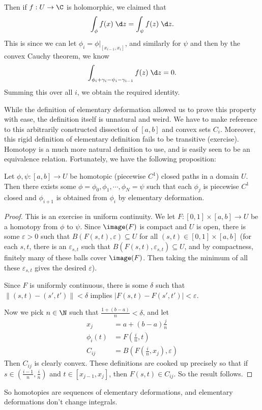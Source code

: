 \documentclass[a4paper]{article}
\begin{document}
Then if $f: U \to \C$ is holomorphic, we claimed that
\[
  \int_\phi f(x)\;\d z = \int_\psi f(z)\;\d z.
\]
This is since we can let $\phi_i = \phi|_{[x_{i - 1}, x_i]}$, and similarly for $\psi$ and then by the convex Cauchy theorem, we know
\[
  \int_{\phi_i + \gamma_i - \psi_i - \gamma_{i - 1}} f(z)\;\d z = 0.
\]
Summing this over all $i$, we obtain the required identity.

While the definition of elementary deformation allowed us to prove this property with ease, the definition itself is unnatural and weird. We have to make reference to this arbitrarily constructed dissection of $[a, b]$ and convex sets $C_i$. Moreover, this rigid definition of elementary definition fails to be transitive (exercise). %
Homotopy is a much more natural definition to use, and is easily seen to be an equivalence relation. Fortunately, we have the following proposition:

\begin{prop}
  Let $\phi, \psi: [a, b] \to U$ be homotopic (piecewise $C^1$) closed paths in a domain $U$. Then there exists some $\phi = \phi_0, \phi_1, \cdots, \phi_N = \psi$ such that each $\phi_j$ is piecewise $C^1$ closed and $\phi_{i + 1}$ is obtained from $\phi_i$ by elementary deformation.
\end{prop}

\begin{proof}
  This is an exercise in uniform continuity. We let $F: [0, 1] \times [a, b] \to U$ be a homotopy from $\phi$ to $\psi$. Since $\image (F)$ is compact and $U$ is open, there is some $\varepsilon > 0$ such that $B(F(s, t), \varepsilon) \subseteq U$ for all $(s, t) \in [0, 1] \times [a, b]$ (for each $s, t$, there is an $\varepsilon_{s, t}$ such that $B(F(s, t), \varepsilon_{s, t}) \subseteq U$, and by compactness, finitely many of these balls cover $\image(F)$. Then taking the minimum of all these $\varepsilon_{s, t}$ gives the desired $\varepsilon$).

  Since $F$ is uniformly continuous, there is some $\delta$ such that $\|(s, t) - (s', t')\| < \delta$ implies $|F(s, t) - F(s', t')| < \varepsilon$.

  Now we pick $n \in \N$ such that $\frac{1 + (b - a)}{n} < \delta$, and let
  \begin{align*}
    x_j &= a + (b - a) \frac{j}{n}\\
    \phi_i(t) &= F\left(\tfrac{i}{n}, t\right)\\
    C_{ij} &= B\left(F\left(\tfrac{i}{n}, x_j\right), \varepsilon\right)
  \end{align*}
  Then $C_{ij}$ is clearly convex. These definitions are cooked up precisely so that if $s \in \left(\frac{i - 1}{n}, \frac{i}{n}\right)$ and $t \in [x_{j - 1}, x_j]$, then $F(s, t) \in C_{ij}$. So the result follows.
\end{proof}
So homotopies are sequences of elementary deformations, and elementary deformations don't change integrals.
\end{document}

